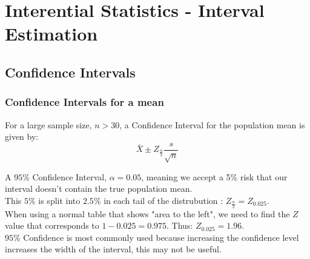 \documentclass[a4paper, 10pt]{article}
\begin{document}
\pagebreak

\section{Interential Statistics - Interval Estimation}
\subsection{Confidence Intervals}
\subsubsection{Confidence Intervals for a mean}

\begin{definitionbox}
    For a large sample size, $n > 30$, a Confidence Interval for the population mean is given by:
    $$\bar{X} \pm Z_{\frac{\alpha}{2}} \frac{s}{\sqrt{n}}$$
\end{definitionbox}
\noindent  A $95\%$ Confidence Interval, $\alpha = 0.05$, meaning we accept a 5\% risk that our interval doesn't contain the true population mean. \\
This $5\%$ is split into $2.5\%$ in each tail of the distrubution : $Z_{\frac{\alpha}{2}} = Z_{0.025}$. \\
When using a normal table that shows "area to the left", we need to find the $Z$ value that corresponds to $1 - 0.025 = 0.975$.
Thus: $Z_{0.025} = 1.96$. \\
$95 \%$ Confidence is most commonly used because increasing the confidence level increases the width of the interval, this may not be useful.
\end{document}
